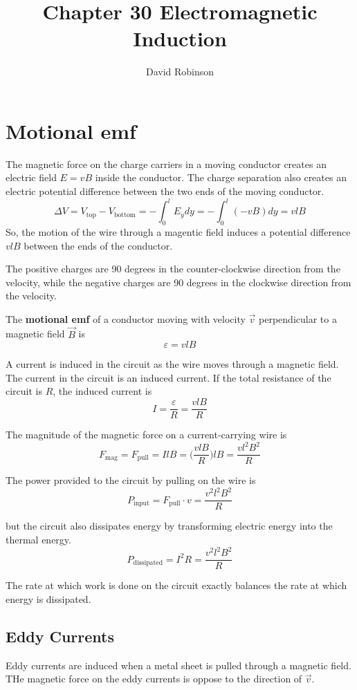 \documentclass{article}
\title{Chapter 30 Electromagnetic Induction}
\author{David Robinson}
\date{}
\begin{document}
\maketitle

\section*{Motional emf}
The magnetic force on the charge carriers in a moving conductor creates an electric field $E=vB$
inside the conductor. The charge separation also creates an electric potential difference between
the two ends of the moving conductor.
\[\Delta V=V_\text{top} - V_\text{bottom} = -\int_0^l E_y dy =-\int_0^l (-vB)dy=vlB\]
So, the motion of the wire through a magentic field induces a potential difference $vlB$ between
the ends of the conductor.

\vspace{1em}
The positive charges are 90 degrees in the counter-clockwise direction from the velocity, while the
negative charges are 90 degrees in the clockwise direction from the velocity.

\vspace{1em}
The \textbf{motional emf} of a conductor moving with velocity $\vec{v}$ perpendicular to a magnetic
field $\vec{B}$ is \[\varepsilon=vlB\]

A current is induced in the circuit as the wire moves through a magnetic field. The current in the
circuit is an induced current. If the total resistance of the circuit is $R$, the induced current
is \[I=\frac{\varepsilon}{R}=\frac{vlB}{R}\]

The magnitude of the magnetic force on a current-carrying wire is
\[F_\text{mag}=F_\text{pull}=IlB=\Big(\frac{vlB}{R}\Big)lB=\frac{vl^2B^2}{R}\]

The power provided to the circuit by pulling on the wire is
\[P_\text{input}=F_\text{pull} \cdot v=\frac{v^2 l^2 B^2}{R}\]

but the circuit also dissipates energy by transforming electric energy into the thermal energy.
\[P_\text{dissipated}=I^2 R=\frac{v^2 l^2 B^2}{R}\]

The rate at which work is done on the circuit exactly balances the rate at which energy is
dissipated.

\subsection*{Eddy Currents}
Eddy currents are induced when a metal sheet is pulled through a magnetic field. THe magnetic force
on the eddy currents is oppose to the direction of $\vec{v}$.
\end{document}
